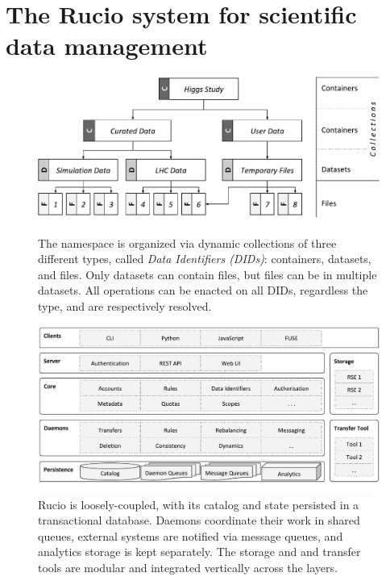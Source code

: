 \documentclass[11pt]{article}
\begin{document}
\section{The Rucio system for scientific data management}
\label{sec:rucio}

\begin{figure}[t]
        \centering
        \includegraphics[width=\textwidth]{figs/rucio_namespace.pdf}
        \caption{The namespace is organized via dynamic collections of three different types, called {\em Data Identifiers (DIDs)}: containers, datasets, and files. Only datasets can contain files, but files can be in multiple datasets. All operations can be enacted on all DIDs, regardless the type, and are respectively resolved.}
        \label{fig:rucio_namespace}
\end{figure}

\begin{figure}[t]
        \centering
        \includegraphics[width=\textwidth]{figs/rucio_arch.pdf}
        \caption{Rucio is loosely-coupled, with its catalog and state persisted in a transactional database. Daemons coordinate their work in shared queues, external systems are notified via message queues, and analytics storage is kept separately. The storage and and transfer tools are modular and integrated vertically across the layers.}
        \label{fig:rucio_arch}
\end{figure}
\end{document}
